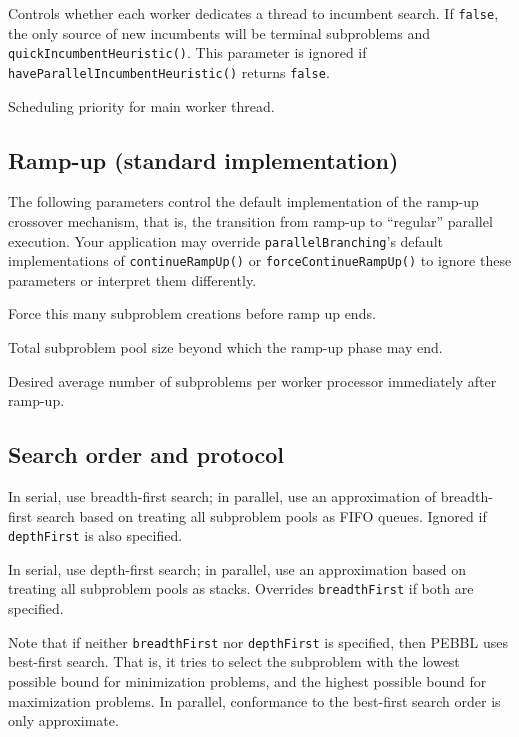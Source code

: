 Controls whether each worker dedicates a thread to incumbent search.
If \texttt{false}, the only source of new incumbents will be terminal
subproblems and  \texttt{quickIncumbentHeuristic()}.  This
parameter is ignored if \texttt{haveParallelIncumbentHeuristic()}
returns \texttt{false}.

Scheduling priority for main worker thread.


\subsection{Ramp-up (standard implementation)}
The following parameters control the default implementation of the
ramp-up crossover mechanism, that is, the transition from ramp-up to
``regular'' parallel execution.  Your application may override
\texttt{parallelBranching}'s default implementations of
\texttt{continueRampUp()} or \texttt{forceContinueRampUp()} to ignore
these parameters or interpret them differently.

Force this many subproblem creations before ramp up ends.

Total subproblem pool size beyond which the ramp-up phase may end.

Desired average number of subproblems per worker processor
immediately after ramp-up.


\subsection{Search order and protocol}
\label{sec:searchparams}
\vspace{-3ex}
In serial, use breadth-first search; in parallel, use an approximation
of breadth-first search based on treating all subproblem pools as FIFO
queues.  Ignored if \texttt{depthFirst} is also specified.

In serial, use depth-first search; in
parallel, use an approximation based on treating all
subproblem pools as stacks.  Overrides \texttt{breadthFirst} if both
are specified.

\vspace{2ex}

Note that if neither \texttt{breadthFirst} nor \texttt{depthFirst} is
specified, then PEBBL uses best-first search.  That is, it tries to
select the subproblem with the lowest possible bound for minimization
problems, and the highest possible bound for maximization problems.
In parallel, conformance to the best-first search order is only approximate.

